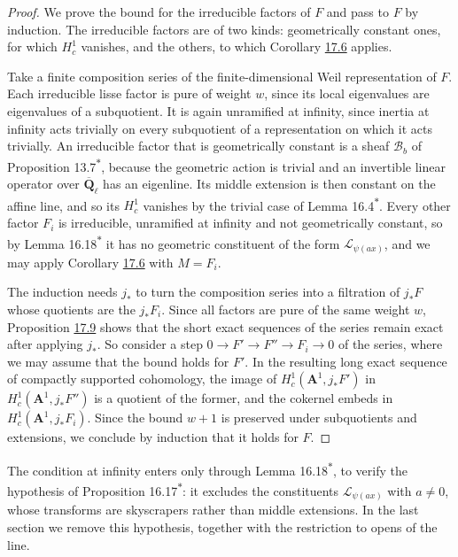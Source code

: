 \documentclass[11pt]{article}
\newcommand{\bpout}[1]{#1\textsuperscript{\hyperlink{bp-outside}{\ensuremath{\ast}}}}
\begin{document}
\begin{proof}[{Proof}]\label{bp31}%
We prove the bound for the irreducible factors of \(F\) and pass to \(F\) by induction. The irreducible factors are of two kinds: geometrically constant ones, for which \(H^1_c\) vanishes, and the others, to which Corollary \hyperref[bp19]{17.6} applies.

Take a finite composition series of the finite-dimensional Weil representation of \(F\). Each irreducible lisse factor is pure of weight \(w\), since its local eigenvalues are eigenvalues of a subquotient. It is again unramified at infinity, since inertia at infinity acts trivially on every subquotient of a representation on which it acts trivially. An irreducible factor that is geometrically constant is a sheaf \(\mathcal B_b\) of Proposition \bpout{13.7}, because the geometric action is trivial and an invertible linear operator over \(\overline{\mathbf Q}_\ell\) has an eigenline. Its middle extension is then constant on the affine line, and so its \(H_c^1\) vanishes by the trivial case of Lemma \bpout{16.4}. Every other factor \(F_i\) is irreducible, unramified at infinity and not geometrically constant, so by Lemma \bpout{16.18} it has no geometric constituent of the form \(\mathcal L_{\psi(ax)}\), and we may apply Corollary \hyperref[bp19]{17.6} with \(M=F_i\).

The induction needs \(j_*\) to turn the composition series into a filtration of \(j_*F\) whose quotients are the \(j_*F_i\). Since all factors are pure of the same weight \(w\), Proposition \hyperref[bp27]{17.9} shows that the short exact sequences of the series remain exact after applying \(j_*\). So consider a step \(0\to F'\to F''\to F_i\to0\) of the series, where we may assume that the bound holds for \(F'\). In the resulting long exact sequence of compactly supported cohomology, the image of \(H^1_c(\mathbf A^1,j_*F')\) in \(H^1_c(\mathbf A^1,j_*F'')\) is a quotient of the former, and the cokernel embeds in \(H^1_c(\mathbf A^1,j_*F_i)\). Since the bound \(w+1\) is preserved under subquotients and extensions, we conclude by induction that it holds for \(F\).
\end{proof}

\label{bp32}%
The condition at infinity enters only through Lemma \bpout{16.18}, to verify the hypothesis of Proposition \bpout{16.17}: it excludes the constituents \(\mathcal L_{\psi(ax)}\) with \(a\ne0\), whose transforms are skyscrapers rather than middle extensions. In the last section we remove this hypothesis, together with the restriction to opens of the line.
\end{document}
